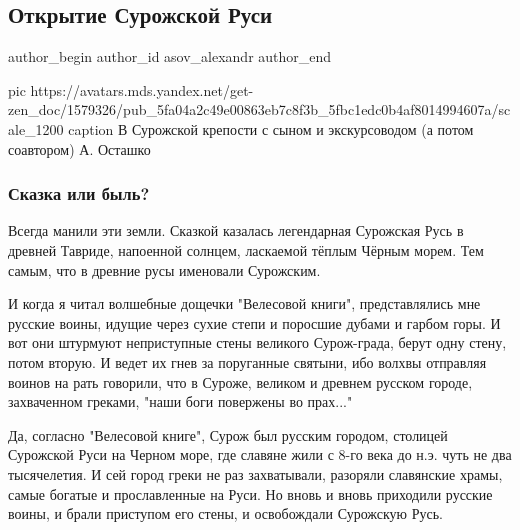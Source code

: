 
 
 
 
 
 
\subsection{Открытие Сурожской Руси}
\label{sec:29_11_2020.sites.ru.zen_yandex.asov_alexandr.1.surozhskaja_rus}
\ifcmt
	author_begin
   author_id asov_alexandr
	author_end
\fi

\ifcmt
  pic https://avatars.mds.yandex.net/get-zen_doc/1579326/pub_5fa04a2c49e00863eb7c8f3b_5fbc1edc0b4af8014994607a/scale_1200
	caption В Сурожской крепости с сыном и экскурсоводом (а потом соавтором) А. Осташко
\fi

\subsubsection{Сказка или быль?}

Всегда манили эти земли. Сказкой казалась легендарная Сурожская Русь в древней
Тавриде, напоенной солнцем, ласкаемой тёплым Чёрным морем. Тем самым, что в
древние русы именовали Сурожским.

И когда я читал волшебные дощечки "Велесовой книги", представлялись мне русские
воины, идущие через сухие степи и поросшие дубами и гарбом горы. И вот они
штурмуют неприступные стены великого Сурож-града, берут одну стену, потом
вторую. И ведет их гнев за поруганные святыни, ибо волхвы отправляя воинов на
рать говорили, что в Суроже, великом и древнем русском городе, захваченном
греками, "наши боги повержены во прах..."

Да, согласно "Велесовой книге", Сурож был русским городом, столицей Сурожской
Руси на Черном море, где славяне жили с 8-го века до н.э. чуть не два
тысячелетия. И сей город греки не раз захватывали, разоряли сла­вянские храмы,
самые богатые и прославленные на Руси. Но вновь и вновь приходили русские
воины, и брали приступом его стены, и освобождали Сурожскую Русь.

